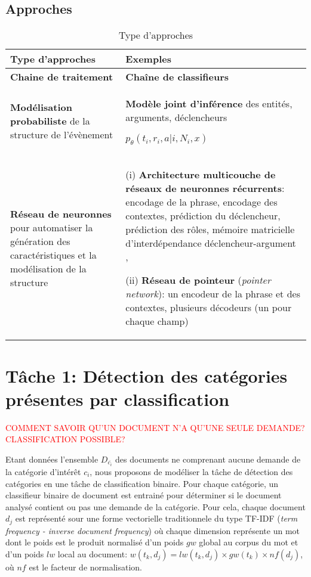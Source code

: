 \subsection{Approches}
\begin{table}[h!]
\small
\begin{tabular}{|p{}|p{}|}
\hline
\textbf{Type d'approches} & \textbf{Exemples} \\ \hline
\textbf{Chaine de traitement} & \textbf{Chaîne de classifieurs  }\cite{ahn2006stages} \\ \hline
\textbf{Modélisation probabiliste} de la structure de l'évènement & \textbf{Modèle joint d'inférence} des entités, arguments, déclencheurs

$p_\theta(t_i, r_i, a \vert i, N_i, x)$ \cite{yang2016jointEntityEvt} %
\\ \hline
\textbf{Réseau de neuronnes} pour automatiser la génération des caractéristiques et la modélisation de la structure & (i) \textbf{Architecture multicouche de réseaux de neuronnes récurrents}: encodage de la phrase, encodage des contextes, prédiction du déclencheur, prédiction des rôles, mémoire matricielle d'interdépendance déclencheur-argument \cite{nguyen2016jointtrgarg},  

(ii) \textbf{Réseau de pointeur} (\textit{pointer network}): un encodeur de la phrase et des contextes, plusieurs décodeurs (un pour chaque champ) \cite{palm2017e2e-dnn} \\ \hline
\end{tabular}
\caption{Type d'approches}
\end{table}


\section{Tâche 1: Détection des catégories présentes par classification}
\textcolor{red}{COMMENT SAVOIR QU'UN DOCUMENT N'A QU'UNE SEULE DEMANDE? CLASSIFICATION POSSIBLE?}

Etant données l'ensemble $D_{\overline{c_i}}$ des documents ne comprenant aucune demande de la catégorie d'intérêt $c_i$, nous proposons de modéliser la tâche de détection des catégories en une tâche de classification binaire. Pour chaque catégorie, un classifieur binaire de document est entrainé pour déterminer si le document analysé contient ou pas une demande de la catégorie. Pour cela, chaque document $d_j$ est représenté sour une forme vectorielle traditionnele du type TF-IDF (\textit{term frequency - inverse document frequency}) où chaque dimension représente un mot dont le poids est le produit normalisé d'un poids $gw$ global au corpus du mot et d'un poids $lw$ local au document: $w(t_k, d_j) = lw(t_k, d_j) \times gw(t_k) \times nf(d_j)$, où $nf$ est le facteur de normalisation. 

